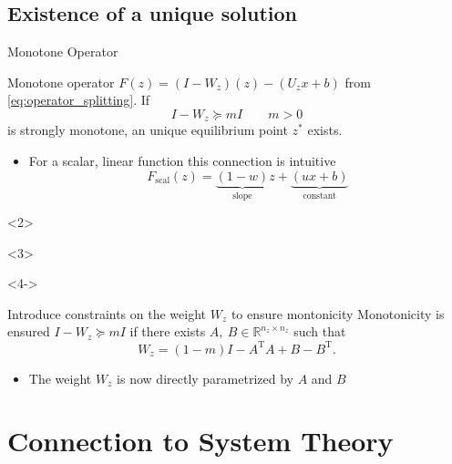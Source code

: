 \documentclass[8pt, t,
aspectratio=169,%
]{beamer}
\begin{document}
\subsection{Existence of a unique solution}
\begin{frame}{Monotone Operator}
    \vspace{-0.5cm}
    \begin{block}{Monotone operator $F(z) = (I-W_z)(z)- (U_z x+b)$ from \eqref{eq:operator_splitting}.}
        If 
        $$
            I-W_z \succeq mI \qquad m>0
        $$
        is strongly monotone, an unique equilibrium point $z^*$ exists.
    \end{block}
    \begin{itemize}
        \item For a scalar, linear function this connection is intuitive
        $$
            F_{\operatorname{scal}}(z) = \underbrace{(1-w)}_{\text{slope}}z + \underbrace{(ux+b)}_{\text{constant}}
        $$ 
    \end{itemize}
    \begin{onlyenv}<2>
        \makeDeqUniform
    \end{onlyenv}
    \begin{onlyenv}<3>
        \makeDeqNormal
    \end{onlyenv}

    \begin{onlyenv}<4->
        \begin{block}{Introduce constraints on the weight $W_z$ to ensure montonicity}
            Monotonicity is ensured $I-W_z\succeq mI$ if there exists $A,~B \in \mathbb{R}^{n_z \times n_z}$ such that
            $$
                W_z = (1-m)I - A^{\mathrm{T}}A+B-B^{\mathrm{T}}.
            $$
        \end{block}
        \begin{itemize}
            \item The weight $W_z$ is now directly parametrized by $A$ and $B$
        \end{itemize}
    \end{onlyenv}
        
\end{frame}


\section{Connection to System Theory}
\end{document}
